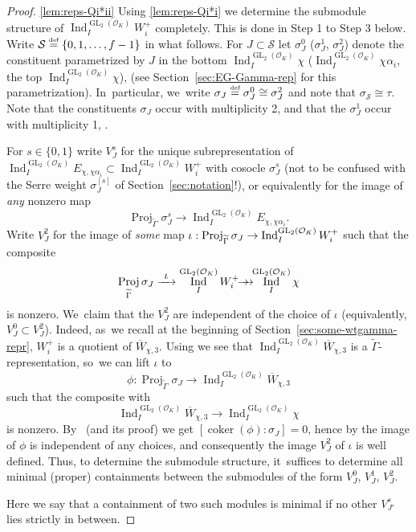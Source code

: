 \documentclass[JEP,XML,SOM,Unicode,NoFloatCountersInSection, NoEqCountersInSection,published]{cedram}
\newcommand{\onto}{\mathchoice{\to\hspace*{-5mm}\to}{\mathrel{\hbox{$\to\hspace*{-2.85mm}\to$}}}{\to\hspace*{-3mm}\to}{\to\hspace*{-3mm}\to}}
\newcommand{\To}[1]{\mathchoice{\xrightarrow{\textstyle\kern4pt#1\kern3pt}}{\stackrel{#1}{\longrightarrow}}{}{}}
\let\wt\widetilde
\newcommand{\defeq}{\stackrel{\textrm{\tiny{\upshape{def}}}}{=}}
\newcommand{\cO}{\mathcal{O}}
\newcommand{\cS}{\mathcal{S}}
\DeclareMathOperator{\coker}{coker}
\DeclareMathOperator{\GL}{GL}
\DeclareMathOperator{\Ind}{Ind}
\DeclareMathOperator{\Proj}{Proj}
\theoremstyle{plain}
\theoremstyle{definition}
\begin{document}
\begin{proof}
\eqref{lem:reps-Qi*ii}
Using \eqref{lem:reps-Qi*i} we determine the submodule structure of $\Ind_I^{\GL_2(\cO_K)} W_i^+$ completely.
This is done in Step 1 to Step 3 below.
Write $\cS \defeq \{0,1,\dots,f-1\}$ in what follows.
For $J \subset \cS$ let $\sigma_J^0$ (\resp $\sigma_J^1$, \resp $\sigma_J^2$) denote the constituent parametrized by $J$
in the bottom $\Ind_I^{\GL_2(\cO_K)} \chi$ (\resp $\Ind_I^{\GL_2(\cO_K)} \chi\alpha_i$, \resp the top $\Ind_I^{\GL_2(\cO_K)} \chi$),
(see Section~\ref{sec:EG-Gamma-rep} for this parametrization). In~particular, we~write $\sigma_J \defeq \sigma_J^0 \cong \sigma_J^2$ and note that $\sigma_\cS \cong \tau$.
Note that the constituents $\sigma_J$ occur with multiplicity 2, and that the $\sigma_J^1$ occur with multiplicity 1, \cf \cite[Lem.\,4.3.3]{BHHMS4}.

For $s \in \{0,1\}$ write $V_J^s$ for the unique subrepresentation of $\Ind_I^{\GL_2(\cO_K)} E_{\chi,\chi\alpha_i} \subset \Ind_I^{\GL_2(\cO_K)} W_i^+$ with cosocle $\sigma_J^s$ {(not to be confused with the Serre weight $\sigma_J^{[s]}$ of Section~\ref{sec:notation}!)}, or equivalently for the image of \emph{any} nonzero map
\[
\Proj_{\wt\Gamma}\sigma_{J}^s\to \Ind_I^{\GL_2(\cO_K)} E_{\chi,\chi\alpha_i}.
\]
Write $V_J^2$ for the image of \emph{some} map $\iota:\Proj_{\wt\Gamma}\sigma_{J}\ra\Ind_I^{\GL_2(\cO_K)} W_i^+$ such that the composite
\[
\Proj_{\wt\Gamma}\sigma_{J}\To{\iota}\Ind_I^{\GL_2(\cO_K)} W_i^+\onto \Ind_I^{\GL_2(\cO_K)}\chi
\]
is nonzero. We~claim that the $V_J^2$ are independent of the choice of $\iota$ (equivalently, $V_J^0 \subset V_J^2$). Indeed, as~we recall at the beginning of Section~\ref{sec:some-wtgamma-repr}, $W_i^+$ is a quotient of $\overline{W}_{\chi,3}$. Using \cite[Cor.\,3.3]{HuWang2} we see that $\Ind_I^{\GL_2(\cO_K)}\overline{W}_{\chi,3}$ is a $\wt\Gamma$-representation, so~we can lift $\iota$ to
\[
\phi:\Proj_{\wt\Gamma}\sigma_J\to \Ind_I^{\GL_2(\cO_K)}\overline{W}_{\chi,3}
\]
such that the composite with
\[
\Ind_I^{\GL_2(\cO_K)}\overline{W}_{\chi,3}\to \Ind_I^{\GL_2(\cO_K)}\chi
\]
is nonzero. By~\cite[Prop.\,3.10(i)]{HuWang2} (and its proof) we get $[\coker(\phi):\sigma_J]=0$, hence by \cite[Prop.\,3.10(ii)]{HuWang2} the image of $\phi$ is independent of any choices, and consequently the image $V_J^2$ of $\iota$ is well defined.
Thus, to determine the submodule structure, it~suffices to determine all minimal (proper) containments between the submodules of the form $V_J^0$, $V_J^1$, $V_J^2$.

Here we say that a containment of two such modules is minimal if no other $V_{J'}^s$ lies strictly in between.


\end{proof}
\end{document}
